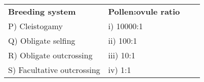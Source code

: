 \begin{center}
\begin{tabular}{|l|l|l|l|}
\hline
\textbf{Breeding system} & \textbf{Pollen:ovule ratio} \\
P) Cleistogamy & i) 10000:1 \\
\hline
Q) Obligate selfing & ii) 100:1 \\
\hline
R) Obligate outcrossing & iii) 10:1 \\
\hline
S) Facultative outcrossing & iv) 1:1 \\
\hline
\end{tabular}
\end{center}